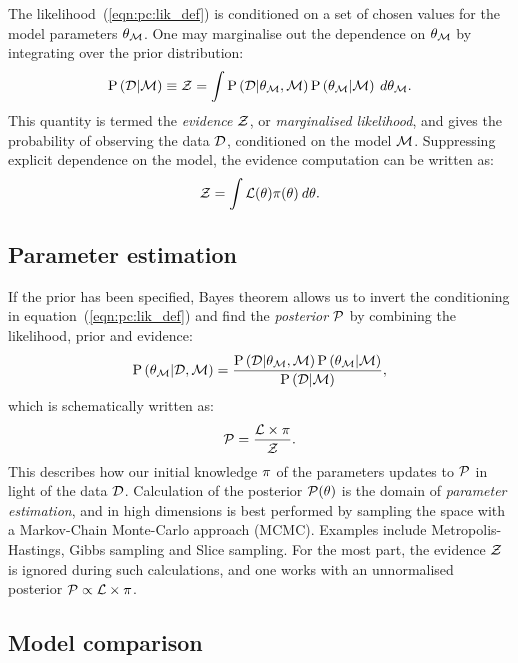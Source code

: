 The likelihood~(\ref{eqn:pc:lik_def}) is conditioned on a set of chosen values for the model parameters $\theta_{\mathcal{M}}$. One may marginalise out the dependence on $\theta_{\mathcal{M}}$ by integrating over the prior distribution:
\begin{equation}
  \mathrm{P}\left(\mathcal{D}\middle|\mathcal{M}\right) \equiv \mathcal{Z} = \int  \mathrm{P}\left(\mathcal{D}\middle|\theta_{\mathcal{M}},\mathcal{M}\right)\mathrm{P}\left(\theta_{\mathcal{M}}\middle|\mathcal{M}\right)\:d\theta_{\mathcal{M}}.
  \label{eqn:pc:ev_int}
\end{equation}
This quantity is termed the {\em evidence\/} $\mathcal{Z}$, or {\em marginalised likelihood}, and gives the probability of observing the data $\mathcal{D}$, conditioned on the model $\mathcal{M}$. Suppressing explicit dependence on the model, the evidence computation can be written as:
\begin{equation}
  \mathcal{Z} = \int \mathcal{L}(\theta)\pi(\theta)\:d\theta.
  \label{eqn:pc:evidence}
\end{equation}

\subsection{Parameter estimation}
\label{sec:pc:param_est}

If the prior has been specified, Bayes theorem allows us to invert the conditioning in equation~(\ref{eqn:pc:lik_def}) and find the {\em posterior\/} $\mathcal{P}$ by combining the likelihood, prior and evidence:
%
\begin{equation}
  \mathrm{P}\left(\theta_{\mathcal{M}}\middle|\mathcal{D},\mathcal{M}\right) = \frac{\mathrm{P}\left(\mathcal{D}\middle|\theta_{\mathcal{M}},\mathcal{M}\right) \mathrm{P}\left(\theta_{\mathcal{M}}\middle|\mathcal{M}\right)}{\mathrm{P}\left(\mathcal{D}\middle|\mathcal{M}\right)},
  \label{eqn:pc:bayes_theorem}
\end{equation}
%
which is schematically written as:
\begin{equation}
  \mathcal{P} = \frac{\mathcal{L} \times \pi }{\mathcal{Z} }.
  \label{eqn:pc:bayes_theorem_abbrv}
\end{equation}
This describes how our initial knowledge $\pi$ of the parameters updates to $\mathcal{P}$ in light of the data $\mathcal{D}$.
Calculation of the posterior $\mathcal{P}(\theta)$ is the domain of {\em parameter estimation}, and in high dimensions is best performed by sampling the space with a Markov-Chain Monte-Carlo approach (MCMC). Examples include Metropolis-Hastings, Gibbs sampling and Slice sampling. For the most part, the evidence $\mathcal{Z}$ is ignored during such calculations, and one works with an unnormalised posterior ${\mathcal{P}\propto\mathcal{L}\times\pi}$.

\subsection{Model comparison}
\label{sec:pc:model_comp}

